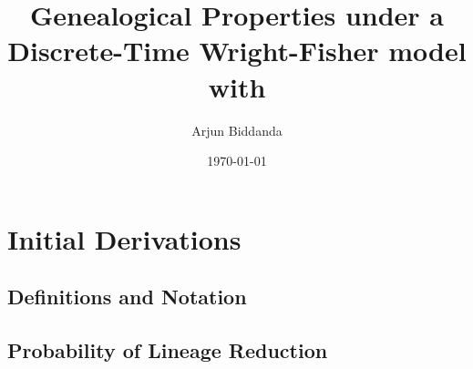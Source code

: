 \documentclass[11pt]{article}
\title{Genealogical Properties under a Discrete-Time Wright-Fisher model with }\author{Arjun Biddanda}
\date{\today}
\begin{document}
\maketitle

\section{Initial Derivations}

\subsection{Definitions and Notation}

\subsection{Probability of Lineage Reduction}
\end{document}
